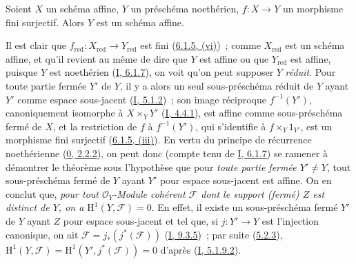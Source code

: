 
\begin{theorem}[6.7.1]
\label{II.6.7.1-fr}
Soient $X$ un schéma affine, $Y$ un préschéma noethérien, $f:X\to Y$ un
morphisme fini surjectif. Alors $Y$ est un schéma affine.
\end{theorem}

Il est clair que
$f_{\mathrm{red}}:X_{\mathrm{red}}\to Y_{\mathrm{red}}$ est fini
(\hyperref[II.6.1.5-fr]{6.1.5, (vi)})~; comme $X_{\mathrm{red}}$ est un
schéma affine, et qu'il revient au même de dire que $Y$ est affine ou que
$Y_{\mathrm{red}}$ est affine, puisque $Y$ est noethérien
(\hyperref[I.6.1.7-fr]{I, 6.1.7}), on voit qu'on peut supposer $Y$
\emph{réduit}. Pour toute partie fermée $Y'$ de $Y$, il y a alors un seul
sous-préschéma réduit de $Y$ ayant $Y'$ comme espace sous-jacent
(\hyperref[I.5.1.2-fr]{I, 5.1.2})~; son image réciproque $f^{-1}(Y')$,
canoniquement isomorphe à $X\times_Y Y'$
(\hyperref[I.4.4.1-fr]{I, 4.4.1}), est affine comme sous-préschéma fermé de
$X$, et la restriction de $f$ à $f^{-1}(Y')$, qui s'identifie à
$f\times_Y 1_{Y'}$, est un morphisme fini surjectif
(\hyperref[II.6.1.5-fr]{6.1.5, (iii)}). En vertu du principe de récurrence
noethérienne (\hyperref[0.2.2.2-fr]{0, 2.2.2}), on peut donc (compte tenu de
\hyperref[I.6.1.7-fr]{I, 6.1.7}) se ramener à démontrer le théorème sous
l'hypothèse que pour \emph{toute partie fermée $Y'\neq Y$}, tout
sous-préschéma fermé de $Y$ ayant $Y'$ pour espace sous-jacent est affine.
On en conclut que, \emph{pour tout $\mathcal{O}_Y$-Module cohérent
$\mathcal{F}$ dont le support (fermé) $Z$ est distinct de $Y$, on a
$\mathrm{H}^1(Y,\mathcal{F})=0$}. En effet, il existe un sous-préschéma fermé
$Y'$ de $Y$ ayant $Z$ pour espace sous-jacent et tel que, si $j:Y'\to Y$ est
l'injection canonique, on ait
$\mathcal{F}=j_*(j^*(\mathcal{F}))$
(\hyperref[I.9.3.5-fr]{I, 9.3.5})~; par suite
(\hyperref[II.5.2.3-fr]{5.2.3}),
$\mathrm{H}^1(Y,\mathcal{F})
=\mathrm{H}^1(Y',j^*(\mathcal{F}))=0$ d'après
(\hyperref[I.5.1.9.2-fr]{I, 5.1.9.2}).

